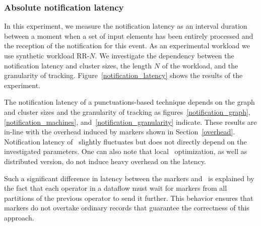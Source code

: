 \subsubsection{Absolute notification latency}
In this experiment, we measure the notification latency as an interval duration between a moment when a set of input elements has been entirely processed and the reception of the notification for this event. As an experimental workload we use synthetic workload RR-$N$. We investigate the dependency between the notification latency and cluster sizes, the length $N$ of the workload, and the granularity of tracking. Figure~\ref{notification_latency} shows the results of the experiment. 

The notification latency of a punctuations-based technique depends on the graph and cluster sizes and the granularity of tracking as figures~\ref{notification_graph},\ref{notification_machines}, and~\ref{notification_granularity} indicate. These results are in-line with the overhead induced by markers shown in Section~\ref{overhead}. Notification latency of \tracker\ slightly fluctuates but does not directly depend on the investigated parameters. One can also note that local \tracker\ optimization, as well as distributed version, do not induce heavy overhead on the latency.

Such a significant difference in latency between the markers and \tracker\ is explained by the fact that each operator in a dataflow must wait for markers from all partitions of the previous operator to send it further. This behavior ensures that markers do not overtake ordinary records that guarantee the correctness of this approach.

